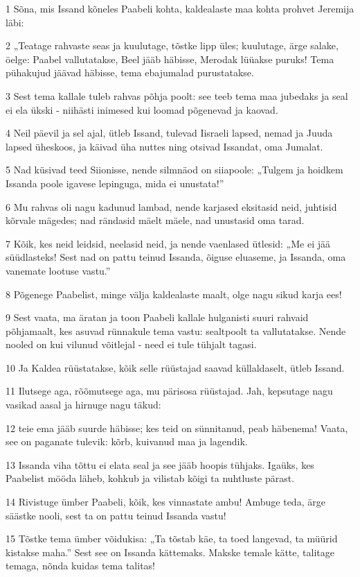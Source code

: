 \par 1 Sõna, mis Issand kõneles Paabeli kohta, kaldealaste maa kohta prohvet Jeremija läbi:
\par 2 „Teatage rahvaste seas ja kuulutage, tõstke lipp üles; kuulutage, ärge salake, öelge: Paabel vallutatakse, Beel jääb häbisse, Merodak lüüakse puruks! Tema pühakujud jäävad häbisse, tema ebajumalad purustatakse.
\par 3 Sest tema kallale tuleb rahvas põhja poolt: see teeb tema maa jubedaks ja seal ei ela ükski - niihästi inimesed kui loomad põgenevad ja kaovad.
\par 4 Neil päevil ja sel ajal, ütleb Issand, tulevad Iisraeli lapsed, nemad ja Juuda lapsed üheskoos, ja käivad üha nuttes ning otsivad Issandat, oma Jumalat.
\par 5 Nad küsivad teed Siionisse, nende silmnäod on siiapoole: „Tulgem ja hoidkem Issanda poole igavese lepinguga, mida ei unustata!”
\par 6 Mu rahvas oli nagu kadunud lambad, nende karjased eksitasid neid, juhtisid kõrvale mägedes; nad rändasid mäelt mäele, nad unustasid oma tarad.
\par 7 Kõik, kes neid leidsid, neelasid neid, ja nende vaenlased ütlesid: „Me ei jää süüdlasteks! Sest nad on pattu teinud Issanda, õiguse eluaseme, ja Issanda, oma vanemate lootuse vastu.”
\par 8 Põgenege Paabelist, minge välja kaldealaste maalt, olge nagu sikud karja ees!
\par 9 Sest vaata, ma äratan ja toon Paabeli kallale hulganisti suuri rahvaid põhjamaalt, kes asuvad rünnakule tema vastu: sealtpoolt ta vallutatakse. Nende nooled on kui vilunud võitlejal - need ei tule tühjalt tagasi.
\par 10 Ja Kaldea rüüstatakse, kõik selle rüüstajad saavad küllaldaselt, ütleb Issand.
\par 11 Ilutsege aga, rõõmutsege aga, mu pärisosa rüüstajad. Jah, kepsutage nagu vasikad aasal ja hirnuge nagu täkud:
\par 12 teie ema jääb suurde häbisse; kes teid on sünnitanud, peab häbenema! Vaata, see on paganate tulevik: kõrb, kuivanud maa ja lagendik.
\par 13 Issanda viha tõttu ei elata seal ja see jääb hoopis tühjaks. Igaüks, kes Paabelist mööda läheb, kohkub ja vilistab kõigi ta nuhtluste pärast.
\par 14 Rivistuge ümber Paabeli, kõik, kes vinnastate ambu! Ambuge teda, ärge säästke nooli, sest ta on pattu teinud Issanda vastu!
\par 15 Tõstke tema ümber võidukisa: „Ta tõstab käe, ta toed langevad, ta müürid kistakse maha.” Sest see on Issanda kättemaks. Makske temale kätte, talitage temaga, nõnda kuidas tema talitas!
